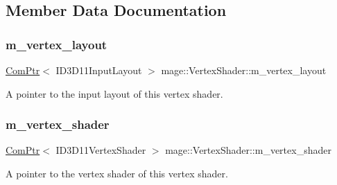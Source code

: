 \subsection{Member Data Documentation}
\hypertarget{classmage_1_1_vertex_shader_a9b9895650b8c7f80af846d75f7d9ddda}{}\label{classmage_1_1_vertex_shader_a9b9895650b8c7f80af846d75f7d9ddda} 
\subsubsection{\texorpdfstring{m\+\_\+vertex\+\_\+layout}{m\_vertex\_layout}}
{\footnotesize\ttfamily \hyperlink{namespacemage_ae74f374780900893caa5555d1031fd79}{Com\+Ptr}$<$ I\+D3\+D11\+Input\+Layout $>$ mage\+::\+Vertex\+Shader\+::m\+\_\+vertex\+\_\+layout\hspace{0.3cm}{\ttfamily [private]}}

A pointer to the input layout of this vertex shader. \hypertarget{classmage_1_1_vertex_shader_a0b2b02abae4cb226c115d7f1c5464a54}{}\label{classmage_1_1_vertex_shader_a0b2b02abae4cb226c115d7f1c5464a54} 
\subsubsection{\texorpdfstring{m\+\_\+vertex\+\_\+shader}{m\_vertex\_shader}}
{\footnotesize\ttfamily \hyperlink{namespacemage_ae74f374780900893caa5555d1031fd79}{Com\+Ptr}$<$ I\+D3\+D11\+Vertex\+Shader $>$ mage\+::\+Vertex\+Shader\+::m\+\_\+vertex\+\_\+shader\hspace{0.3cm}{\ttfamily [private]}}

A pointer to the vertex shader of this vertex shader. 